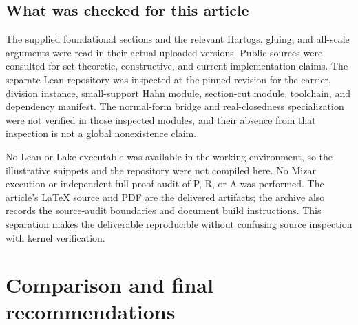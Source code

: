 \documentclass[11pt,letterpaper]{article}
\numberwithin{equation}{section}
\theoremstyle{definition}
\theoremstyle{remark}
\begin{document}
\subsection{What was checked for this article}
The supplied foundational sections and the relevant Hartogs, gluing, and all-scale arguments were read in their actual uploaded versions. Public sources were consulted for set-theoretic, constructive, and current implementation claims. The separate Lean repository was inspected at the pinned revision for the carrier, division instance, small-support Hahn module, section-cut module, toolchain, and dependency manifest. The normal-form bridge and real-closedness specialization were not verified in those inspected modules, and their absence from that inspection is not a global nonexistence claim.

No Lean or Lake executable was available in the working environment, so the illustrative snippets and the repository were not compiled here. No Mizar execution or independent full proof audit of P, R, or A was performed. The article's LaTeX source and PDF are the delivered artifacts; the archive also records the source-audit boundaries and document build instructions. This separation makes the deliverable reproducible without confusing source inspection with kernel verification.

\section{Comparison and final recommendations}\label{sec:conclusion}
\end{document}
